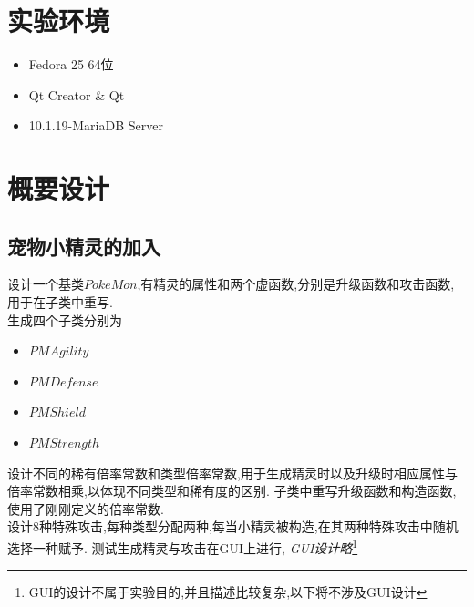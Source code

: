\documentclass{article}
\begin{document}
\section{实验环境}
\label{sec:environment}
\begin{itemize}
\item Fedora 25 64位
\item Qt Creator \& Qt 
\item 10.1.19-MariaDB Server
\end{itemize}

\section{概要设计}
\label{sec:brief}

\subsection{宠物小精灵的加入}
  设计一个基类$PokeMon$,有精灵的属性和两个虚函数,分别是升级函数和攻击函数,用于在子类中重写.\\
  生成四个子类分别为
  \begin{itemize}
  \item $PMAgility$
  \item $PMDefense$
  \item $PMShield$
  \item $PMStrength$
  \end{itemize}
  设计不同的稀有倍率常数和类型倍率常数,用于生成精灵时以及升级时相应属性与倍率常数相乘,以体现不同类型和稀有度的区别.
  子类中重写升级函数和构造函数,使用了刚刚定义的倍率常数.\\
  设计8种特殊攻击,每种类型分配两种,每当小精灵被构造,在其两种特殊攻击中随机选择一种赋予.
  测试生成精灵与攻击在GUI上进行, \emph{GUI设计略}\footnote{GUI的设计不属于实验目的,并且描述比较复杂,以下将不涉及GUI设计}
\end{document}
